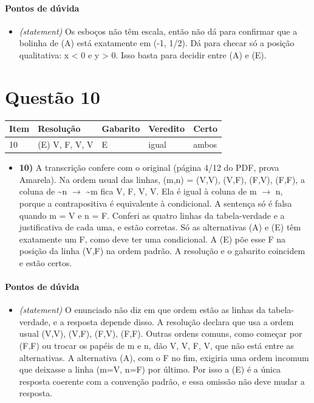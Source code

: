 \documentclass{article}%
\begin{document}
\paragraph{Pontos de dúvida}%
\begin{itemize}%
\item%
\textit{(statement)} Os esboços não têm escala, então não dá para confirmar que a bolinha de (A) está exatamente em (-1, 1/2). Dá para checar só a posição qualitativa: x < 0 e y > 0. Isso basta para decidir entre (A) e (E).%
\end{itemize}%
\section*{Questão 10}%
\begin{longtable}{@{}p{} p{} p{} p{} p{}@{}}\toprule Item & Resolução & Gabarito & Veredito & Certo \\ \midrule
10 & (E) V, F, V, V & E & igual & ambos \\
\bottomrule\end{longtable}%
\begin{itemize}%
\item%
\textbf{10)} A transcrição confere com o original (página 4/12 do PDF, prova Amarela). Na ordem usual das linhas, (m,n) = (V,V), (V,F), (F,V), (F,F), a coluna de \textasciitilde{}n $\to$ \textasciitilde{}m fica V, F, V, V. Ela é igual à coluna de m $\to$ n, porque a contrapositiva é equivalente à condicional. A sentença só é falsa quando m = V e n = F. Conferi as quatro linhas da tabela{-}verdade e a justificativa de cada uma, e estão corretas. Só as alternativas (A) e (E) têm exatamente um F, como deve ter uma condicional. A (E) põe esse F na posição da linha (V,F) na ordem padrão. A resolução e o gabarito coincidem e estão certos.%
\end{itemize}%
\paragraph{Pontos de dúvida}%
\begin{itemize}%
\item%
\textit{(statement)} O enunciado não diz em que ordem estão as linhas da tabela{-}verdade, e a resposta depende disso. A resolução declara que usa a ordem usual (V,V), (V,F), (F,V), (F,F). Outras ordens comuns, como começar por (F,F) ou trocar os papéis de m e n, dão V, V, F, V, que não está entre as alternativas. A alternativa (A), com o F no fim, exigiria uma ordem incomum que deixasse a linha (m=V, n=F) por último. Por isso a (E) é a única resposta coerente com a convenção padrão, e essa omissão não deve mudar a resposta.%
\end{itemize}%
\end{document}
